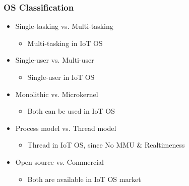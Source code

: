 \documentclass{beamer}
\begin{document}
\begin{frame}
	\frametitle{OS Classification}
	\begin{itemize}
		\justifying
		\item Single-tasking vs. Multi-tasking
			\begin{itemize}
				\item<2-> Multi-tasking in IoT OS
			\end{itemize}
		\item Single-user vs. Multi-user
			\begin{itemize}
				\item<2-> Single-user in IoT OS
			\end{itemize}		
		\item Monolithic vs. Microkernel
			\begin{itemize}
				\item<2-> Both can be used in IoT OS
			\end{itemize}		
		\item Process model vs. Thread model
			\begin{itemize}
				\item<2-> Thread in IoT OS, since No MMU \& Realtimeness
			\end{itemize}					
		\item Open source vs. Commercial
			\begin{itemize}
				\item<2-> Both are available in IoT OS market
			\end{itemize}				
	\end{itemize}
\end{frame}
\end{document}
